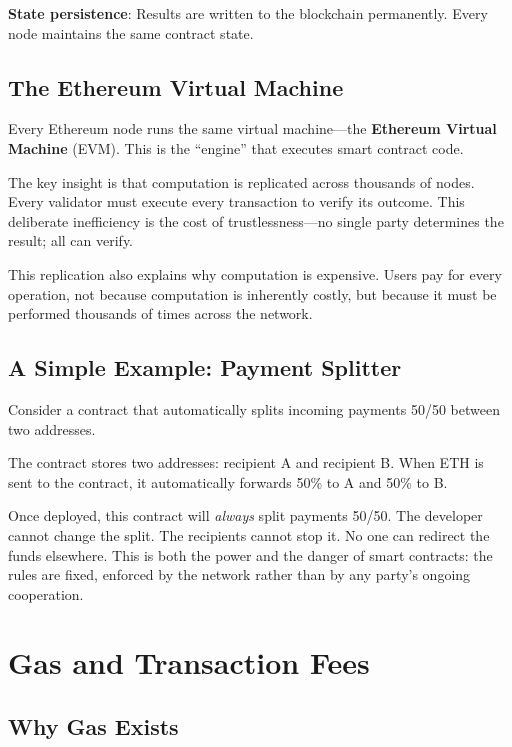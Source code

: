 \documentclass[11pt,a4paper]{article}
\newcommand{\keyword}[1]{\textbf{\textcolor{AccentOrange}{#1}}}
\begin{document}
\textbf{State persistence}: Results are written to the blockchain permanently. Every node maintains the same contract state.

\subsection{The Ethereum Virtual Machine}

Every Ethereum node runs the same virtual machine---the \keyword{Ethereum Virtual Machine} (EVM). This is the ``engine'' that executes smart contract code.

The key insight is that computation is replicated across thousands of nodes. Every validator must execute every transaction to verify its outcome. This deliberate inefficiency is the cost of trustlessness---no single party determines the result; all can verify.

This replication also explains why computation is expensive. Users pay for every operation, not because computation is inherently costly, but because it must be performed thousands of times across the network.

\subsection{A Simple Example: Payment Splitter}

Consider a contract that automatically splits incoming payments 50/50 between two addresses.

The contract stores two addresses: recipient A and recipient B. When ETH is sent to the contract, it automatically forwards 50\% to A and 50\% to B.

Once deployed, this contract will \textit{always} split payments 50/50. The developer cannot change the split. The recipients cannot stop it. No one can redirect the funds elsewhere. This is both the power and the danger of smart contracts: the rules are fixed, enforced by the network rather than by any party's ongoing cooperation.

\section{Gas and Transaction Fees}

\subsection{Why Gas Exists}
\end{document}
